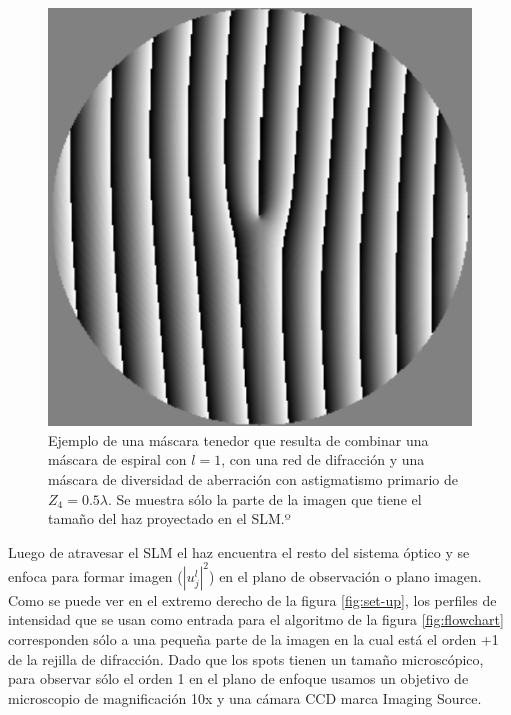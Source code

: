\begin{figure}[h!]
\centering
\includegraphics[scale=.5]{mixed_mask_compact.pdf}
\caption[Ejemplo de una máscara tenedor con astigmatismo.]{Ejemplo de una máscara tenedor que resulta de combinar una
  máscara de espiral con $l=1$, con una red de difracción y una
  máscara de diversidad de aberración con astigmatismo primario de
  $Z_4=0.5\lambda$. Se muestra sólo la parte de la imagen que tiene el
tamaño del haz proyectado en el SLM.º} 
\label{fig:mixed_mask}
\end{figure}

Luego de atravesar el SLM el haz encuentra el resto del sistema óptico
y se enfoca para formar imagen ($|u_j^l|^2$) en el plano de observación o plano
imagen. 
Como se puede ver en el extremo derecho de la figura \ref{fig:set-up},
los perfiles de intensidad que se usan como entrada para el algoritmo
de la figura \ref{fig:flowchart} corresponden sólo a una pequeña parte
de la imagen en la cual está el orden +1 de la rejilla de
difracción. Dado que los spots tienen un tamaño microscópico, para observar sólo
el orden 1 en el plano de enfoque usamos un objetivo de 
microscopio de magnificación 10x y una cámara \acrshort{CCD} marca Imaging
Source.    

